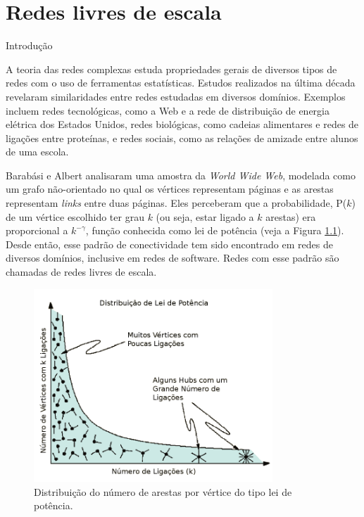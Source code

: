 
\chapter{Redes livres de escala}

\begin{section}{Introdução} \label{sec:redes-complexas}

A teoria das redes complexas estuda propriedades gerais de diversos tipos de redes com o uso de ferramentas estatísticas. Estudos realizados na última década revelaram similaridades entre redes estudadas em diversos domínios. Exemplos incluem redes tecnológicas, como a Web e a rede de distribuição de energia elétrica dos Estados Unidos, redes biológicas, como cadeias alimentares e redes de ligações entre proteínas, e redes sociais, como as relações de amizade entre alunos de uma escola.

Barabási e Albert \cite{Barabasi1999} analisaram uma amostra da \emph{World Wide Web}, modelada como um grafo não-orientado no qual os vértices representam páginas e as arestas representam \emph{links} entre duas páginas. Eles perceberam que a probabilidade, P($k$) de um vértice escolhido ter grau $k$ (ou seja, estar ligado a $k$ arestas) era proporcional a $k^{-\gamma}$, função conhecida como lei de potência (veja a Figura \ref{fig:leidepotencia}). Desde então, esse padrão de conectividade tem sido encontrado em redes de diversos domínios, inclusive em redes de software. Redes com esse padrão são chamadas de redes livres de escala.

\begin{figure}[htbp]
	\centering
	\includegraphics[width=0.8\textwidth]{leidepotencia}
	\caption{Distribuição do número de arestas por vértice do tipo lei de potência.}%
	\label{fig:leidepotencia}
\end{figure}


\end{section}
